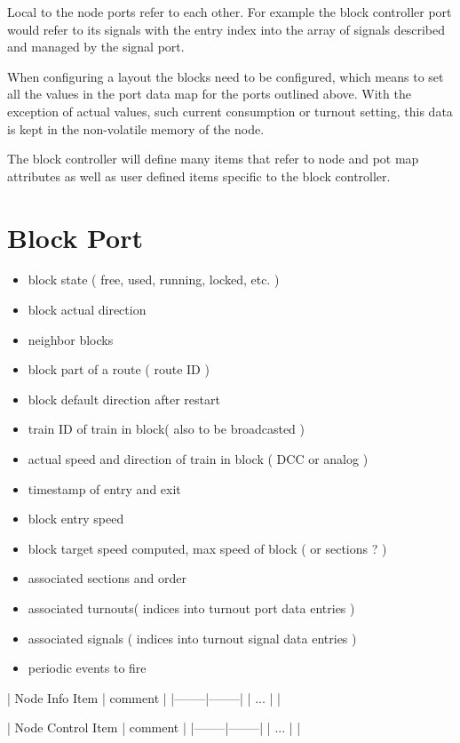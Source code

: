 Local to the node ports refer to each other. For example the block controller port would refer to its signals with the entry index into the array of signals described and managed by the signal port.

When configuring a layout the blocks need to be configured, which means to set all the values in the port data map for the ports outlined above. With the exception of actual values, such current consumption or turnout setting, this data is kept in the non-volatile memory of the node.

The block controller will define many items that refer to node and pot map attributes as well as user defined items specific to the block controller.

\section{Block Port}

\begin{itemize}
\begin{itemize}
\item block state ( free, used, running, locked, etc. )
\item block actual direction
\item neighbor blocks
\item block part of a route ( route ID )
\item block default direction after restart
\item train ID of train in block( also to be broadcasted )
\item actual speed and direction of train in block ( DCC or analog )
\item timestamp of entry and exit
\item block entry speed
\item block target speed computed, max speed of block ( or sections ? )
\item associated sections and order
\item associated turnouts( indices into turnout port data entries )
\item associated signals ( indices into turnout signal data entries )
\item periodic events to fire
\end{itemize}
\end{itemize}

| Node Info Item | comment |
|--------|--------|
| ... | |

| Node Control Item | comment |
|--------|--------|
| ... | |

